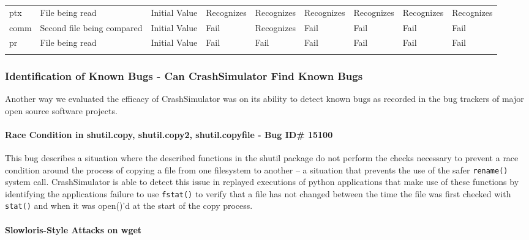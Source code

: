 \begin{table*}[t]
\begin{tabular}{l  l  l  l  l  l  l  l  l}
                  ptx         & File being read            & Initial Value  & Recognizes     & Recognizes  & Recognizes & Recognizes  & Recognizes & Recognizes\\
                  comm        & Second file being compared & Initial Value  & Fail           & Recognizes  & Fail       & Fail        & Fail       & Fail\\
                  pr          & File being read            & Initial Value  & Fail           & Fail        & Fail       & Fail        & Fail       & Fail\\
                \bottomrule{}
                \end{tabular}
            \end{table*}

        \subsubsection{Identification of Known Bugs - Can CrashSimulator Find Known Bugs}

        Another way we evaluated the efficacy of CrashSimulator was on its ability to detect known bugs as recorded in
        the bug trackers of major open source software projects.

            \paragraph{Race Condition in shutil.copy, shutil.copy2, shutil.copyfile - Bug ID\# 15100}
              
            This bug describes a situation where the described functions in the shutil package do not perform the checks
            necessary to prevent a race condition around the process of copying a file from one filesystem to another --
            a situation that prevents the use of the safer {\tt rename()} system call.  CrashSimulator is able to detect this
            issue in replayed executions of python applications that make use of these functions by identifying the
            applications failure to use {\tt fstat()} to verify that a file has not changed between the time the file was
            first checked with {\tt stat()} and when it was open()'d at the start of the copy process.

            \paragraph{Slowloris-Style Attacks on wget}

